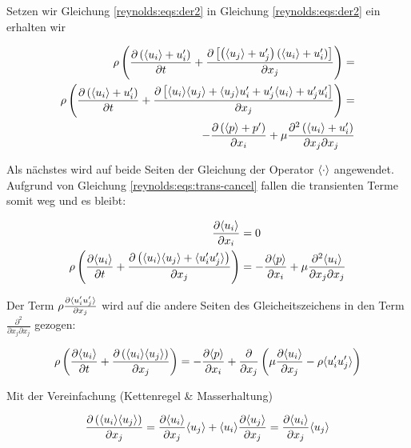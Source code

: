 Setzen wir Gleichung \ref{reynolds:eqs:der2} in Gleichung \ref{reynolds:eqs:der2} ein erhalten wir

\begin{align}
    \rho \left(
            \frac{\partial \left( \langle u_i \rangle + u_i' \right)}{\partial t} +
            \frac{\partial \left[ \left( \langle u_j \rangle + u_j' \right) \left( \langle u_i \rangle + u_i' \right) \right]}{\partial x_j}
        \right) = \\
    \rho \left(
            \frac{\partial \left( \langle u_i \rangle + u_i' \right)}{\partial t} +
            \frac{\partial \left[ \langle u_i \rangle \langle u_j \rangle  + \langle u_j \rangle u_i' + u_j' \langle u_i \rangle + u_j' u_i'\right]}{\partial x_j}
        \right) = \\
    - \frac{\partial \left( \langle p \rangle + p' \right)}{\partial x_i} + 
    \mu \frac{\partial^2 \left( \langle u_i \rangle + u_i' \right)}{\partial x_j \partial x_j}
\end{align}

Als nächstes wird auf beide Seiten der Gleichung der Operator $\langle \cdot \rangle$ angewendet.
Aufgrund von Gleichung \ref{reynolds:eqs:trans-cancel} fallen die transienten Terme somit
weg und es bleibt:

\begin{align}
    \frac{\partial \langle u_i \rangle}{\partial x_i} &= 0 \\
    \rho \left(
            \frac{\partial \langle u_i \rangle}{\partial t} +
            \frac{\partial \left( \langle u_i \rangle \langle u_j \rangle + \langle u_i' u_j' \rangle\right)}{\partial x_j}
        \right) &=
        - \frac{\partial \langle p \rangle}{\partial x_i} + 
        \mu \frac{\partial^2 \langle u_i \rangle}{\partial x_j \partial x_j}
\end{align}

Der Term $\rho \frac{\partial \langle u_i' u_j' \rangle}{\partial x_j}$ wird auf die andere Seiten
des Gleicheitszeichens in den Term $\frac{\partial^2}{\partial x_j \partial x_j}$ gezogen:

\begin{equation}
    \rho \left(
            \frac{\partial \langle u_i \rangle}{\partial t} +
            \frac{\partial \left( \langle u_i \rangle \langle u_j \rangle\right)}{\partial x_j}
        \right) =
        - \frac{\partial \langle p \rangle}{\partial x_i} + 
            \frac{\partial}{\partial x_j} \left(
            \mu \frac{\partial \langle u_i \rangle}{\partial x_j} - \rho \langle u_i' u_j' \rangle
        \right)
\end{equation}

Mit der Vereinfachung (Kettenregel \& Masserhaltung)

\begin{equation}
    \frac{\partial \left( \langle u_i \rangle \langle u_j \rangle\right)}{\partial x_j} = \\
        \frac{\partial \langle u_i \rangle}{\partial x_j} \langle u_j \rangle +
        \langle u_i \rangle \frac{\partial \langle u_j \rangle}{\partial x_j} = \\
        \frac{\partial \langle u_i \rangle}{\partial x_j} \langle u_j \rangle
\end{equation}

